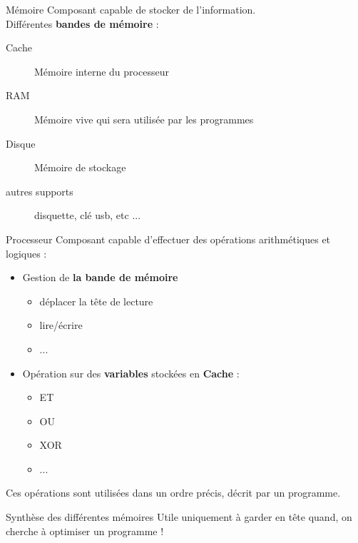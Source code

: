 \begin{frame}{Mémoire}
    Composant capable de stocker de l'information. \\
    \newline
    Différentes \textbf{bandes de mémoire} :
    \begin{description}
        \item[Cache] Mémoire interne du processeur
        \item[RAM] Mémoire vive qui sera utilisée par les programmes
        \item[Disque] Mémoire de stockage
        \item[autres supports] disquette, clé usb, etc ...
    \end{description}
\end{frame}

\begin{frame}{Processeur}
    Composant capable d'effectuer des opérations arithmétiques et logiques :
    \begin{itemize}
        \item Gestion de \textbf{la bande de mémoire}
        \begin{itemize}
            \item déplacer la tête de lecture
            \item lire/écrire
            \item ...
        \end{itemize}
        \item Opération sur des \textbf{variables} stockées en \textbf{Cache} :
        \begin{itemize}
            \item ET
            \item OU
            \item XOR
            \item ...
        \end{itemize}
    \end{itemize}
    Ces opérations sont utilisées dans un ordre précis, décrit par un programme.
\end{frame}

\begin{frame}{Synthèse des différentes mémoires}
    Utile uniquement à garder en tête quand, on cherche à optimiser un programme !
\end{frame}
